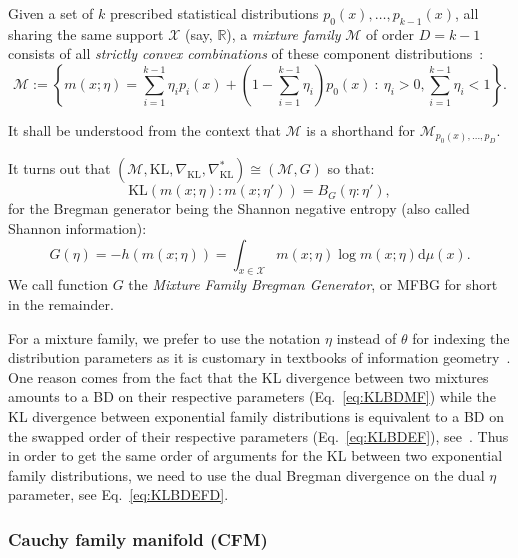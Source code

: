\documentclass[graybox]{svmult}
\def\dmu{\mathrm{d}\mu}
\def\KL{\mathrm{KL}}
\def\eqdef{:=}
\def\bbR{\mathbb{R}}
\def\calX{\mathcal{X}}
\def\calM{\mathcal{M}}
\def\st{{\ :\ }}
\begin{document}
	\begin{definition}\label{def:mf}
	Given a set of $k$ prescribed statistical distributions $p_0(x),\ldots, p_{k-1}(x)$, all sharing the same support $\calX$ (say, $\bbR$), a
 {\em mixture family} $\calM$ of order $D=k-1$ consists of all {\em strictly convex combinations} of these component distributions~\cite{wmixture-2017,geowmixtures-2018}:
\begin{equation}
\calM \eqdef  \left\{ m(x;\eta)= \sum_{i=1}^{k-1} \eta_ip_i(x)+ (1-\sum_{i=1}^{k-1} \eta_i)p_0(x) \st \eta_i>0, \sum_{i=1}^{k-1} \eta_i<1 \right\}.
\end{equation}
\end{definition}
It shall be understood from the context that $\calM$ is a shorthand for $\calM_{p_0(x),\ldots, p_{D}}$.


	It turns out that $(\calM,\KL,\nabla_\KL,\nabla_\KL^*)\cong (\calM,G)$ so that:
	\begin{equation}\label{eq:KLBDMF}
\KL(m(x;\eta):m(x;\eta')) = B_G(\eta:\eta'),
\end{equation}
for the Bregman generator being the Shannon negative entropy (also called Shannon information):
\begin{equation}\label{eq:negent}
G(\eta)=-h(m(x;\eta))=\int_{x\in\calX} m(x;\eta)\log m(x;\eta) \dmu(x).
\end{equation}
	We call function $G$ the {\em Mixture Family Bregman Generator}, or MFBG for short in the remainder.
	
	For a mixture family, we prefer to use the notation $\eta$ instead of  $\theta$ for indexing the distribution parameters as it is customary in  textbooks of information geometry~\cite{IG-2014,IG-2016}.
One reason comes from the fact that the KL divergence between two mixtures amounts to a BD on their respective parameters (Eq.~\ref{eq:KLBDMF}) while the KL divergence between exponential family distributions is equivalent to a BD on the swapped order of their respective parameters (Eq.~\ref{eq:KLBDEF}), see~\cite{AW-KLBD-2001,Frongillo-2014}. Thus in order to get the same order of arguments for the KL between  two  exponential family distributions, we need to use the dual Bregman divergence on the dual $\eta$ parameter, see Eq.~\ref{eq:KLBDEFD}.

	
	
	
\subsubsection{Cauchy family manifold (CFM)}
\end{document}
